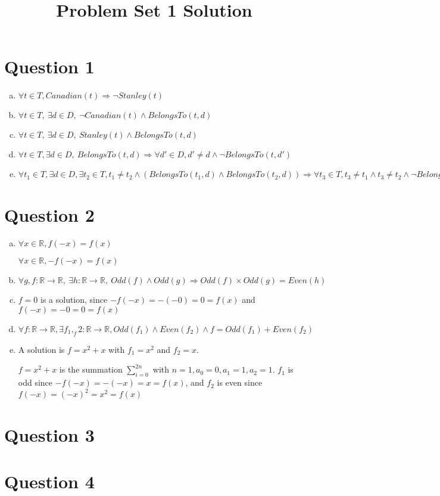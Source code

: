 \documentclass[12pt]{article}
\begin{document}
\title{Problem Set 1 Solution}
\maketitle

\section*{Question 1}
\begin{enumerate}[a.]
    \item $\forall t \in T, Canadian(t) \Rightarrow \neg Stanley(t)$
    \item $\forall t \in T,\:\exists d \in D,\:\neg Canadian(t) \land BelongsTo(t,d)$
    \item $\forall t \in T,\:\exists d \in D,\:Stanley(t) \land BelongsTo(t,d)$
    \item $\forall t \in T, \exists d \in D,\:BelongsTo(t,d) \Rightarrow \forall d' \in D, d' \neq d \land \neg BelongsTo(t,d')$
    \item $\forall t_1 \in T, \exists d \in D, \exists t_2 \in T, t_1 \neq t_2 \land (BelongsTo(t_1, d) \land BelongsTo(t_2,d)) \Rightarrow \forall t_3 \in T, t_3 \neq t_1 \land t_3 \neq t_2 \land \neg BelongsTo(t_3, d)$
\end{enumerate}

\section*{Question 2}
\begin{enumerate}[a.]
    \item
    $\forall x \in \mathbb{R}, f(-x) = f(x)$

    $\forall x \in \mathbb{R}, -f(-x) = f(x)$

    \item

    $\forall g,f:\mathbb{R} \to \mathbb{R},\:\exists h:\mathbb{R} \to \mathbb{R},\:Odd(f) \land Odd(g) \Rightarrow Odd(f) \times Odd(g) = Even(h)$

    \item

    $f = 0$ is a solution, since $-f(-x) = -(-0) = 0 = f(x)$ and $f(-x) = -0 = 0 = f(x)$

    \item

    $\forall f: \mathbb{R} \to \mathbb{R}, \exists f_1, _f2:\mathbb{R} \to \mathbb{R}, Odd(f_1) \land Even(f_2) \land f = Odd(f_1) + Even(f_2)$

    \item

    A solution is $f = x^2 + x$ with $f_1 = x^2$ and $f_2 = x$.

    $f = x^2 + x$ is the summation $\sum\limits_{i=0}^{2n}$ with $n = 1, a_0 = 0, a_1 = 1, a_2 = 1$.
    $f_1$ is odd since $-f(-x) = -(-x) = x = f(x)$, and $f_2$ is even since $f(-x) = (-x)^2 = x^2 = f(x)$

\end{enumerate}

\section*{Question 3}

\section*{Question 4}
\end{document}
